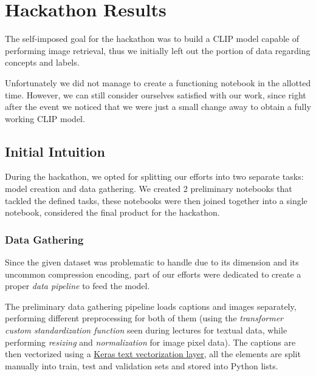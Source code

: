 \documentclass[10pt,twocolumn,letterpaper]{article}
\begin{document}


\section{Hackathon Results}
The self-imposed goal for the hackathon was to build a CLIP model capable of performing image retrieval, thus we initially left out the portion of data regarding concepts and labels.

Unfortunately we did not manage to create a functioning notebook in the allotted time.
However, we can still consider ourselves satisfied with our work, since right after the event we noticed that we were just a small change away to obtain a fully working CLIP model.

\subsection{Initial Intuition}
During the hackathon, we opted for splitting our efforts into two separate tasks: model creation and data gathering.
We created 2 preliminary notebooks that tackled the defined tasks, these notebooks were then joined together into a single notebook, considered the final product for the hackathon.

\subsubsection{Data Gathering}
Since the given dataset was problematic to handle due to its dimension and its uncommon compression encoding, part of our efforts were dedicated to create a proper \textit{data pipeline} to feed the model.

The preliminary data gathering pipeline loads captions and images separately, performing different preprocessing for both of them (using the \textit{transformer custom standardization function} seen during lectures for textual data, while performing \textit{resizing} and \textit{normalization} for image pixel data).
The captions are then vectorized using a \href{https://www.tensorflow.org/api_docs/python/tf/keras/layers/TextVectorization}{Keras text vectorization layer}, all the elements are split manually into train, test and validation sets and stored into Python lists.
\end{document}
